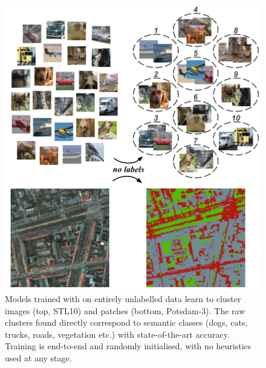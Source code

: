 \begin{figure}[t]

\includegraphics[height=1.1\textwidth]{experiments2_files/splash2.png}

\caption{\label{f:splash} Models trained with \methodnameshort on entirely unlabelled data learn to cluster images (top, STL10) and patches (bottom, Potsdam-3). The raw clusters found directly correspond to semantic classes (dogs, cats, trucks, roads, vegetation etc.) with state-of-the-art accuracy.  Training is end-to-end and randomly initialised, with no heuristics used at any stage.}
\end{figure}
